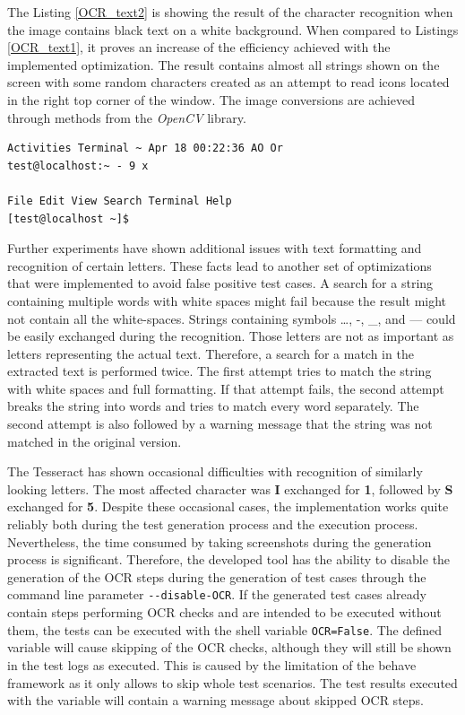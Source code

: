 The Listing \ref{OCR_text2} is showing the result of the character recognition when the image contains black text on a white background. When compared to Listings \ref{OCR_text1}, it proves an increase of the efficiency achieved with the implemented optimization. The result contains almost all strings shown on the screen with some random characters created as an attempt to read icons located in the right top corner of the window. The image conversions are achieved through methods from the \textit{OpenCV} library. 

\begin{lstlisting}[caption={Text generated from the inverted binarized image in Figure \ref{ocr_conversion}},label={OCR_text2}]
 Activities Terminal ~ Apr 18 00:22:36 AO Or
test@localhost:~ - 9 x

File Edit View Search Terminal Help
[test@localhost ~]$
\end{lstlisting}

Further experiments have shown additional issues with text formatting and recognition of certain letters. These facts lead to another set of optimizations that were implemented to avoid false positive test cases. A search for a string containing multiple words with white spaces might fail because the result might not contain all the white-spaces. Strings containing symbols …, -, \_, and — could be easily exchanged during the recognition. Those letters are not as important as letters representing the actual text. Therefore, a search for a match in the extracted text is performed twice. The first attempt tries to match the string with white spaces and full formatting. If that attempt fails, the second attempt breaks the string into words and tries to match every word separately. The second attempt is also followed by a warning message that the string was not matched in the original version.

The Tesseract has shown occasional difficulties with recognition of similarly looking letters. The most affected character was \textbf{I} exchanged for \textbf{1}, followed by \textbf{S} exchanged for \textbf{5}. Despite these occasional cases, the implementation works quite reliably both during the test generation process and the execution process. Nevertheless, the time consumed by taking screenshots during the generation process is significant. Therefore, the developed tool has the ability to disable the generation of the OCR steps during the generation of test cases through the command line parameter \texttt{-{}-disable-OCR}. If the generated test cases already contain steps performing OCR checks and are intended to be executed without them, the tests can be executed with the shell variable \texttt{OCR=False}. The defined variable will cause skipping of the OCR checks, although they will still be shown in the test logs as executed. This is caused by the limitation of the behave framework as it only allows to skip whole test scenarios. The test results executed with the variable will contain a warning message about skipped OCR steps.

